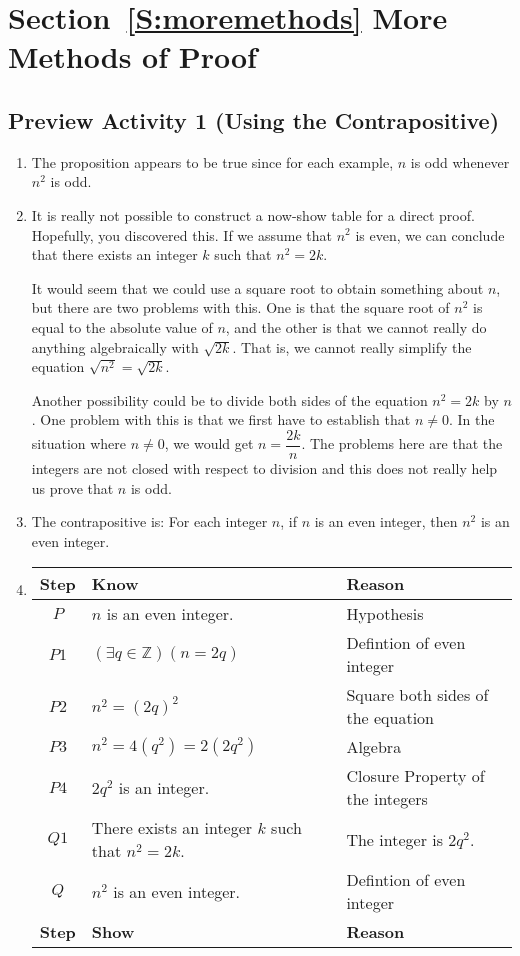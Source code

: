 \section*{Section~\ref{S:moremethods} More Methods of Proof}

\subsection*{Preview Activity 1 (Using the Contrapositive)}
\begin{enumerate}
  \item The proposition appears to be true since for each example,   $n$  is odd whenever  $n^2$  is odd.
  \item It is really not possible to construct a now-show table for a direct proof.  Hopefully, you discovered this.  If we assume that  $n^2 $ is even, we can conclude that there exists an integer  $k$  such that  $n^2  = 2k$.  

It would seem that we could use a square root to obtain something about  $n$, but there are two problems with this.  One is that the square root of  $n^2 $ is equal to the absolute value of  
$n$, and the other is that we cannot really do anything algebraically with  $\sqrt {2k} $.  That is, we cannot really simplify the equation  $\sqrt {n^2 }  = \sqrt {2k} $.

Another possibility could be to divide both sides of the equation  $n^2  = 2k$ by $n$.  One problem with this is that we first have to establish that  $n \ne 0$.  In the situation where  $n \ne 0$, we would get  $n = \dfrac{{2k}}{n}$.  The problems here are that the integers are not closed with respect to division and this does not really help us prove that  $n$  is odd.

  \item The contrapositive is:  For each integer $n$, if $n$ is an even integer, then $n^2$ is an even integer.

\item 
\begin{tabular}[t]{| c | l | l |} \hline
\textbf{Step} & \textbf{Know} & \textbf{Reason} \\ \hline
$P$  &  $n$  is an even integer.  & Hypothesis \\ \hline
$P1$  &  $( {\exists q \in \mathbb{Z}} )( {n = 2q} )$ & Defintion of even integer \\ \hline
$P2$  &  $n^2  = ( {2q} )^2 $ &  Square both sides of the equation \\ \hline
$P3$  &  $n^2 = 4 ( q^2 ) = 2 ( 2q^2 ) $  &  Algebra \\ \hline
$P4$  &  $2q^2$ is an integer.  &  Closure Property of the integers \\ \hline
$Q1$  &  There exists an integer $k$ such that $n^2 = 2k$.  &  The integer is $2q^2$. \\ \hline
$Q$   &  $n^2$ is an even integer.  &  Defintion of even integer \\ \hline
\textbf{Step} & \textbf{Show} & \textbf{Reason} \\ \hline
\end{tabular}


\end{enumerate}
